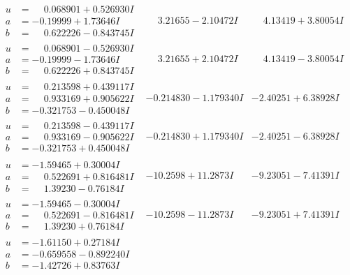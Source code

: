 \documentclass[1p]{elsarticle_modified}
\theoremstyle{definition}
\begin{document}
$$\begin{array}{c|c|c}
\begin{aligned}
u &= \phantom{-}0.068901 + 0.526930 I \\
a &= -0.19999 + 1.73646 I \\
b &= \phantom{-}0.622226 - 0.843745 I\end{aligned}
 & \phantom{-}3.21655 - 2.10472 I & \phantom{-}4.13419 + 3.80054 I \\ \hline\begin{aligned}
u &= \phantom{-}0.068901 - 0.526930 I \\
a &= -0.19999 - 1.73646 I \\
b &= \phantom{-}0.622226 + 0.843745 I\end{aligned}
 & \phantom{-}3.21655 + 2.10472 I & \phantom{-}4.13419 - 3.80054 I \\ \hline\begin{aligned}
u &= \phantom{-}0.213598 + 0.439117 I \\
a &= \phantom{-}0.933169 + 0.905622 I \\
b &= -0.321753 - 0.450048 I\end{aligned}
 & -0.214830 - 1.179340 I & -2.40251 + 6.38928 I \\ \hline\begin{aligned}
u &= \phantom{-}0.213598 - 0.439117 I \\
a &= \phantom{-}0.933169 - 0.905622 I \\
b &= -0.321753 + 0.450048 I\end{aligned}
 & -0.214830 + 1.179340 I & -2.40251 - 6.38928 I \\ \hline\begin{aligned}
u &= -1.59465 + 0.30004 I \\
a &= \phantom{-}0.522691 + 0.816481 I \\
b &= \phantom{-}1.39230 - 0.76184 I\end{aligned}
 & -10.2598 + 11.2873 I & -9.23051 - 7.41391 I \\ \hline\begin{aligned}
u &= -1.59465 - 0.30004 I \\
a &= \phantom{-}0.522691 - 0.816481 I \\
b &= \phantom{-}1.39230 + 0.76184 I\end{aligned}
 & -10.2598 - 11.2873 I & -9.23051 + 7.41391 I \\ \hline\begin{aligned}
u &= -1.61150 + 0.27184 I \\
a &= -0.659558 - 0.892240 I \\
b &= -1.42726 + 0.83763 I\end{aligned}

\end{array}$$
\end{document}
